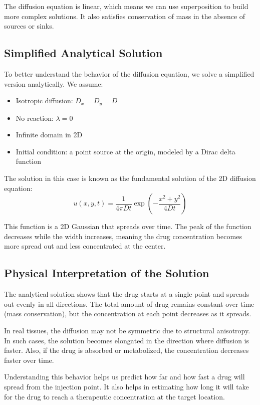 \documentclass[11pt, a4paper]{article}
\begin{document}
The diffusion equation is linear, which means we can use superposition to build more complex solutions. It also satisfies conservation of mass in the absence of sources or sinks.

\subsection{Simplified Analytical Solution}
To better understand the behavior of the diffusion equation, we solve a simplified version analytically. We assume:
\begin{itemize}
    \item Isotropic diffusion: \( D_x = D_y = D \)
    \item No reaction: \( \lambda = 0 \)
    \item Infinite domain in 2D
    \item Initial condition: a point source at the origin, modeled by a Dirac delta function
\end{itemize}

The solution in this case is known as the fundamental solution of the 2D diffusion equation:
\[
u(x, y, t) = \frac{1}{4\pi D t} \exp\left( -\frac{x^2 + y^2}{4Dt} \right)
\]

This function is a 2D Gaussian that spreads over time. The peak of the function decreases while the width increases, meaning the drug concentration becomes more spread out and less concentrated at the center.

\subsection{Physical Interpretation of the Solution}
The analytical solution shows that the drug starts at a single point and spreads out evenly in all directions. The total amount of drug remains constant over time (mass conservation), but the concentration at each point decreases as it spreads.

In real tissues, the diffusion may not be symmetric due to structural anisotropy. In such cases, the solution becomes elongated in the direction where diffusion is faster. Also, if the drug is absorbed or metabolized, the concentration decreases faster over time.

Understanding this behavior helps us predict how far and how fast a drug will spread from the injection point. It also helps in estimating how long it will take for the drug to reach a therapeutic concentration at the target location.
\end{document}
